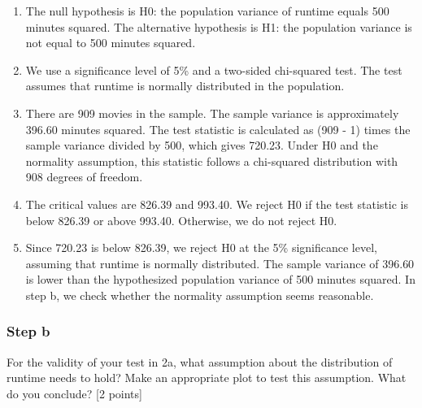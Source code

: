 \documentclass[
]{article}
\newenvironment{Shaded}{\begin{snugshade}}{\end{snugshade}}
\newcommand{\AttributeTok}[1]{\textcolor[rgb]{0.13,0.29,0.53}{#1}}
\newcommand{\CommentTok}[1]{\textcolor[rgb]{0.56,0.35,0.01}{\textit{#1}}}
\newcommand{\FunctionTok}[1]{\textcolor[rgb]{0.13,0.29,0.53}{\textbf{#1}}}
\newcommand{\NormalTok}[1]{#1}
\newcommand{\SpecialCharTok}[1]{\textcolor[rgb]{0.81,0.36,0.00}{\textbf{#1}}}
\newcommand{\StringTok}[1]{\textcolor[rgb]{0.31,0.60,0.02}{#1}}
\begin{document}
\begin{enumerate}
\def\labelenumi{\arabic{enumi}.}
\item
  The null hypothesis is H0: the population variance of runtime equals
  500 minutes squared. The alternative hypothesis is H1: the population
  variance is not equal to 500 minutes squared.
\item
  We use a significance level of 5\% and a two-sided chi-squared test.
  The test assumes that runtime is normally distributed in the
  population.
\item
  There are 909 movies in the sample. The sample variance is
  approximately 396.60 minutes squared. The test statistic is calculated
  as (909 - 1) times the sample variance divided by 500, which gives
  720.23. Under H0 and the normality assumption, this statistic follows
  a chi-squared distribution with 908 degrees of freedom.
\item
  The critical values are 826.39 and 993.40. We reject H0 if the test
  statistic is below 826.39 or above 993.40. Otherwise, we do not reject
  H0.
\item
  Since 720.23 is below 826.39, we reject H0 at the 5\% significance
  level, assuming that runtime is normally distributed. The sample
  variance of 396.60 is lower than the hypothesized population variance
  of 500 minutes squared. In step b, we check whether the normality
  assumption seems reasonable.
\end{enumerate}

\subsubsection{Step b}\label{step-b-4}

For the validity of your test in 2a, what assumption about the
distribution of runtime needs to hold? Make an appropriate plot to test
this assumption. What do you conclude? {[}2 points{]}

\begin{Shaded}
\end{Shaded}
\end{document}
